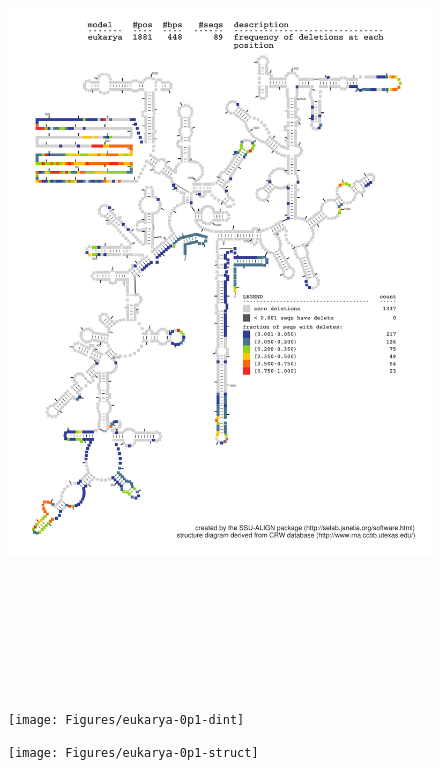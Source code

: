 \begin{figure}
\includegraphics[height=8.5in]{Figures/eukarya-0p1-dall}
\label{fig:eukinfo}
\end{figure}

\newpage

\begin{figure}
\texttt{[image: Figures/eukarya-0p1-dint]}
\label{fig:eukinfo}
\end{figure}

\newpage

\begin{figure}
\texttt{[image: Figures/eukarya-0p1-struct]}
\label{fig:eukinfo}
\end{figure}






